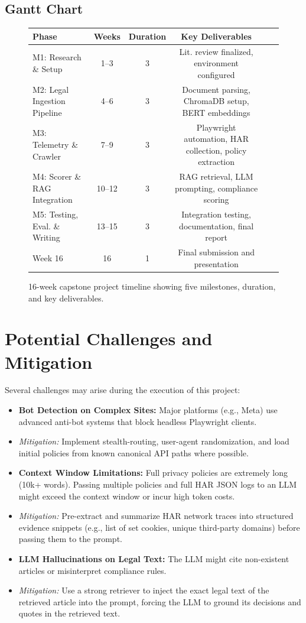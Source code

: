\documentclass[11pt,a4paper]{article}
\begin{document}
\subsection{Gantt Chart}
\begin{figure}[h]
\centering
\begin{tabular}{|l|c|c|c|c|c|}
\hline
\textbf{Phase} & \textbf{Weeks} & \textbf{Duration} & \textbf{Key Deliverables} \\
\hline
M1: Research \& Setup & 1--3 & 3 & Lit. review finalized, environment configured \\
\hline
M2: Legal Ingestion Pipeline & 4--6 & 3 & Document parsing, ChromaDB setup, BERT embeddings \\
\hline
M3: Telemetry \& Crawler & 7--9 & 3 & Playwright automation, HAR collection, policy extraction \\
\hline
M4: Scorer \& RAG Integration & 10--12 & 3 & RAG retrieval, LLM prompting, compliance scoring \\
\hline
M5: Testing, Eval. \& Writing & 13--15 & 3 & Integration testing, documentation, final report \\
\hline
Week 16 & 16 & 1 & Final submission and presentation \\
\hline
\end{tabular}
\caption{16-week capstone project timeline showing five milestones, duration, and key deliverables.}
\label{fig:gantt}
\end{figure}

\section{Potential Challenges and Mitigation}
Several challenges may arise during the execution of this project:
\begin{itemize}
    \item \textbf{Bot Detection on Complex Sites:} Major platforms (e.g., Meta) use advanced anti-bot systems that block headless Playwright clients.
    \item \textit{Mitigation:} Implement stealth-routing, user-agent randomization, and load initial policies from known canonical API paths where possible.
    \item \textbf{Context Window Limitations:} Full privacy policies are extremely long (10k+ words). Passing multiple policies and full HAR JSON logs to an LLM might exceed the context window or incur high token costs.
    \item \textit{Mitigation:} Pre-extract and summarize HAR network traces into structured evidence snippets (e.g., list of set cookies, unique third-party domains) before passing them to the prompt.
    \item \textbf{LLM Hallucinations on Legal Text:} The LLM might cite non-existent articles or misinterpret compliance rules.
    \item \textit{Mitigation:} Use a strong retriever to inject the exact legal text of the retrieved article into the prompt, forcing the LLM to ground its decisions and quotes in the retrieved text.
\end{itemize}
\end{document}

